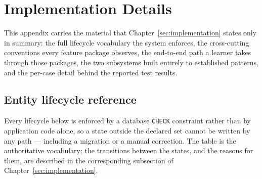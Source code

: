 ﻿\section{Implementation Details}
\label{appendix:implementation}

This appendix carries the material that Chapter~\ref{sec:implementation} states only in summary: the full lifecycle vocabulary the system enforces, the cross-cutting conventions every feature package observes, the end-to-end path a learner takes through those packages, the two subsystems built entirely to established patterns, and the per-case detail behind the reported test results.

\subsection{Entity lifecycle reference}

Every lifecycle below is enforced by a database \texttt{CHECK} constraint rather than by application code alone, so a state outside the declared set cannot be written by any path --- including a migration or a manual correction. The table is the authoritative vocabulary; the transitions between the states, and the reasons for them, are described in the corresponding subsection of Chapter~\ref{sec:implementation}.

